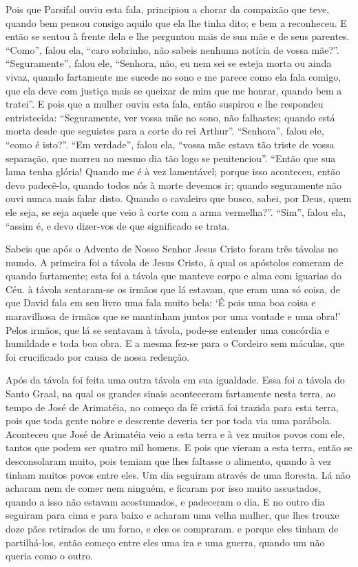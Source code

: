 Pois que Parsifal ouviu esta fala, principiou a chorar da compaixão que
teve, quando bem pensou consigo aquilo que ela lhe tinha dito; e bem a
reconheceu. E então se sentou à frente dela e lhe perguntou mais de sua mãe e
de seus parentes. “Como”, falou ela, “caro sobrinho, não sabeis nenhuma notícia
de vossa mãe?”. “Seguramente”, falou ele, “Senhora, não, eu nem sei se esteja
morta ou ainda vivaz, quando fartamente me sucede no sono e me parece como ela
fala comigo, que ela deve com justiça mais se queixar de mim que me honrar,
quando bem a tratei”. E pois que a mulher ouviu esta fala, então suspirou e lhe
respondeu entristecida: “Seguramente, ver vossa mãe no sono, não falhastes;
quando está morta desde que seguistes para a corte do rei Arthur”. “Senhora”,
falou ele, “como é isto?”. “Em verdade”, falou ela, “vossa mãe estava tão
triste de vossa separação, que morreu no mesmo dia tão logo se penitenciou”.
“Então que sua lama tenha glória! Quando me é à vez lamentável; porque isso
aconteceu, então devo padecê-lo, quando todos nós à morte devemos ir; quando
seguramente não ouvi nunca mais falar disto. Quando o cavaleiro que busco,
sabei, por Deus, quem ele seja, se seja aquele que veio à corte com a arma
vermelha?”. “Sim”, falou ela, “assim é, e devo dizer-vos de que significado se
trata.

Sabeis que após o Advento de Nosso Senhor Jesus Cristo foram três távolas no
mundo. A primeira foi a távola de Jesus Cristo, à qual os apóstolos comeram de
quando fartamente; esta foi a távola que manteve corpo e alma com iguarias do
Céu. à távola sentaram-se os irmãos que lá estavam, que eram uma só coisa, de
que David fala em seu livro uma fala muito bela: ‘É pois uma boa coisa e
maravilhosa de irmãos que se mantinham juntos por uma vontade e uma obra!’
Pelos irmãos, que lá se sentavam à távola, pode-se entender uma concórdia e
humildade e toda boa obra. E a mesma fez-se para o Cordeiro sem máculas, que
foi crucificado por causa de nossa redenção. 

Após da távola foi feita uma outra távola em sua igualdade. Essa foi a
távola do Santo Graal, na qual os grandes sinais aconteceram fartamente nesta
terra, ao tempo de José de Arimatéia, no começo da fé cristã foi trazida para
esta terra, pois que toda gente nobre e descrente deveria ter por toda via uma
parábola. Aconteceu que José de Arimatéia veio a esta terra e à vez muitos
povos com ele, tantos que podem ser quatro mil homens. E pois que vieram a esta
terra, então se desconsolaram muito, pois temiam que lhes faltasse o alimento,
quando à vez tinham muitos povos entre eles. Um dia seguiram através de uma
floresta. Lá não acharam nem de comer nem ninguém, e ficaram por isso muito
assustados, quando a isso não estavam acostumados, e padeceram o dia. E no
outro dia seguiram para cima e para baixo e acharam uma velha mulher, que lhes
trouxe doze pães retirados de um forno, e eles os compraram. e porque eles
tinham de partilhá-los,  então começo entre eles uma ira e uma guerra, quando
um não queria como o outro.


